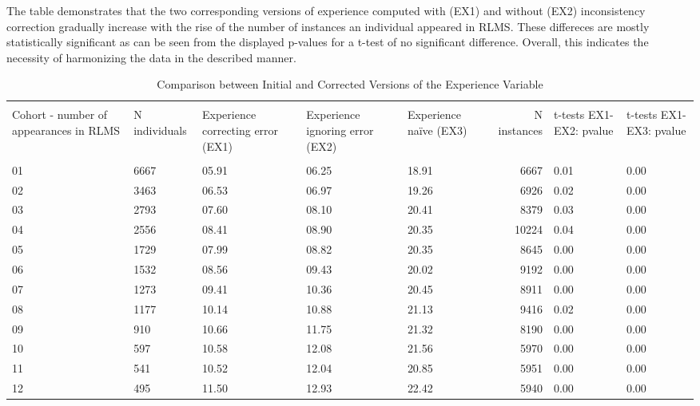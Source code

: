 \documentclass[12pt,a4paper]{article}
\numberwithin{equation}{section}
\begin{document}
The table demonstrates that the two corresponding versions of experience computed with (EX1) and without (EX2) inconsistency correction gradually increase with the rise of the number of instances an individual appeared in RLMS. These differeces are mostly statistically significant as can be seen from the displayed p-values for a t-test of no significant difference.  Overall, this indicates the necessity of harmonizing the data in the described manner. 
\\





\begin{table}[H]
\footnotesize
\def\arraystretch{1} 
        \centering
        \caption{Comparison between Initial and Corrected Versions of the Experience Variable}
        \label{tab:1}
\begin{tabular}{p{3cm}p{1.5cm}p{1.5cm}p{1.5cm}p{1.5cm}rp{1cm}p{1cm}}
  \hline\hline \\
Cohort - number of  appearances in RLMS & N individuals & Experience correcting error (EX1)  & Experience ignoring error (EX2) & Experience na\"ive (EX3) & N instances & t-tests EX1-EX2: pvalue & t-tests EX1-EX3: pvalue \\ 
  \hline \\
01 & 6667 & 05.91 & 06.25 & 18.91 & 6667 & 0.01 & 0.00 \\ 
    02 & 3463 & 06.53 & 06.97 & 19.26 & 6926 & 0.02 & 0.00 \\ 
    03 & 2793 & 07.60 & 08.10 & 20.41 & 8379 & 0.03 & 0.00 \\ 
    04 & 2556 & 08.41 & 08.90 & 20.35 & 10224 & 0.04 & 0.00 \\ 
    05 & 1729 & 07.99 & 08.82 & 20.35 & 8645 & 0.00 & 0.00 \\ 
    06 & 1532 & 08.56 & 09.43 & 20.02 & 9192 & 0.00 & 0.00 \\ 
    07 & 1273 & 09.41 & 10.36 & 20.45 & 8911 & 0.00 & 0.00 \\ 
    08 & 1177 & 10.14 & 10.88 & 21.13 & 9416 & 0.02 & 0.00 \\ 
    09 & 910 & 10.66 & 11.75 & 21.32 & 8190 & 0.00 & 0.00 \\ 
   10 & 597 & 10.58 & 12.08 & 21.56 & 5970 & 0.00 & 0.00 \\ 
   11 & 541 & 10.52 & 12.04 & 20.85 & 5951 & 0.00 & 0.00 \\ 
   12 & 495 & 11.50 & 12.93 & 22.42 & 5940 & 0.00 & 0.00 \\ 

\end{tabular}
\end{table}
\end{document}
